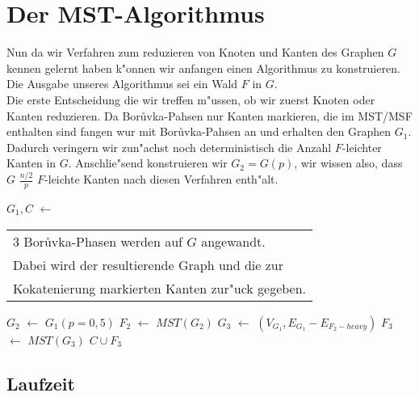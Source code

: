 \section{Der MST-Algorithmus}

Nun da wir Verfahren zum reduzieren von Knoten und Kanten des Graphen $G$ kennen
    gelernt haben  k"onnen wir anfangen einen Algorithmus zu konstruieren.
    Die Ausgabe unseres Algorithmus sei ein Wald $F$ in $G$.\\
Die erste Entscheidung die wir treffen m"ussen, ob wir zuerst Knoten oder Kanten
    reduzieren. Da Bor\r uvka-Pahsen nur Kanten markieren, die im MST/MSF 
    enthalten sind fangen wur mit Bor\r uvka-Pahsen an und erhalten den Graphen 
    $G_1$.
    Dadurch veringern wir
    zun"achst noch deterministisch die Anzahl $F$-leichter Kanten in $G$.
    Anschlie"send konstruieren wir $G_2 = G(p)$, wir wissen also, dass $G$ 
    $\frac{n/2}{p}$ $F$-leichte Kanten nach diesen Verfahren enth"alt.\\
\begin{algorithm}
\begin{algorithmic}[1]
    \STATE $G_1, C$ $\leftarrow$\begin{tabular}[H]{l}
                                 3 Bor\r uvka-Phasen werden auf $G$ angewandt.\\
                                 Dabei wird der resultierende Graph und die zur\\
                                 Kokatenierung markierten Kanten zur"uck gegeben.
                                 \end{tabular}
    \STATE $G_2$ $\leftarrow$ $G_1(p=0,5)$
    \STATE $F_2$ $\leftarrow$ $MST(G_2)$
    \STATE $G_3$ $\leftarrow$ $(V_{G_1}, E_{G_1} - E_{F_2-heavy})$
    \STATE $F_3$ $\leftarrow$ $MST(G_3)$
    \RETURN $C \cup F_3$
\end{algorithmic}
\end{algorithm}

\subsection{Laufzeit}

